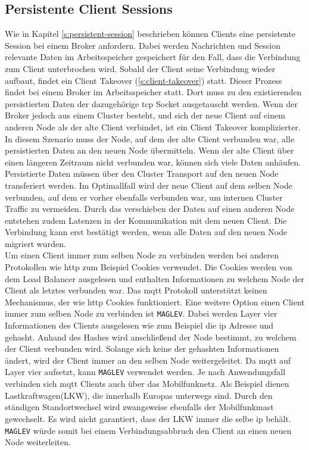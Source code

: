 \subsection{Persistente Client Sessions}
Wie in Kapitel \ref{s:persistent-session} beschrieben können Clients eine persistente Session bei einem Broker anfordern. Dabei werden Nachrichten und Session relevante Daten im Arbeitsspeicher gespeichert für den Fall, dass die Verbindung zum Client unterbrochen wird. Sobald der Client seine Verbindung wieder aufbaut, findet ein Client Takeover (\ref{s:client-takeover}) statt.
Dieser Prozess findet bei einem Broker im Arbeitsspeicher statt.
Dort muss zu den existierenden persistierten Daten der dazugehörige \ac{tcp} Socket ausgetauscht werden.
Wenn der Broker jedoch aus einem Cluster besteht, und sich der neue Client auf einem anderen Node als der alte Client verbindet, ist ein Client Takeover komplizierter.
In diesem Szenario muss der Node, auf dem der alte Client verbunden war, alle persistierten Daten an den neuen Node übermitteln.
Wenn der alte Client über einen längeren Zeitraum nicht verbunden war, können sich viele Daten anhäufen.
Persistierte Daten müssen über den Cluster Transport auf den neuen Node transferiert werden. Im Optimallfall wird der neue Client auf dem selben Node verbunden, auf dem er vorher ebenfalls verbunden war, um internen Cluster Traffic zu vermeiden. Durch das verschieben der Daten auf einen anderen Node entstehen zudem Latenzen in der Kommunikation mit dem neuen Client. Die Verbindung kann erst bestätigt werden, wenn alle Daten auf den neuen Node migriert wurden.
\\
Um einen Client immer zum selben Node zu verbinden werden bei anderen Protokollen wie \ac{http} zum Beispiel Cookies verwendet. Die Cookies werden von dem Load Balancer ausgelesen und enthalten Informationen zu welchem Node der Client als letztes verbunden war. Das \ac{mqtt} Protokoll unterstützt keinen Mechanismus, der wie \ac{http} Cookies funktioniert.
Eine weitere Option einen Client immer zum selben Node zu verbinden ist \verb|MAGLEV|. Dabei werden Layer vier Informationen des Clients ausgelesen wie zum Beispiel die \ac{ip} Adresse und gehasht. Anhand des Hashes wird anschlie{\ss}end der Node bestimmt, zu welchem der Client verbunden wird. Solange sich keine der gehashten Informationen ändert, wird der Client immer an den selben Node weitergeleitet. Da \ac{mqtt} auf Layer vier aufsetzt, kann \verb|MAGLEV| verwendet werden.
Je nach Anwendungsfall verbinden sich \ac{mqtt} Clients auch über das Mobilfunknetz. Als Beispiel dienen Lastkraftwagen(LKW), die innerhalb Europas unterwegs sind. Durch den ständigen Standortwechsel wird zwangsweise ebenfalls der Mobilfunkmast gewechselt. Es wird nicht garantiert, dass der LKW immer die selbe \ac{ip} behält. \verb|MAGLEV| würde somit bei einem Verbindungsabbruch den Client an einen neuen Node weiterleiten.

